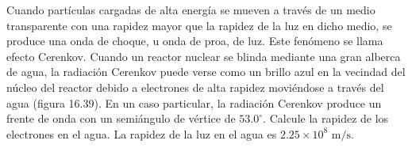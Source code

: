 \item Cuando partículas cargadas de alta energía se mueven a través de un medio transparente con una rapidez mayor que la rapidez de la luz en dicho medio, se produce una onda de choque, u onda de proa, de luz. Este fenómeno se llama efecto Cerenkov. Cuando un reactor nuclear se blinda mediante una gran alberca de agua, la radiación Cerenkov puede verse como un brillo azul en la vecindad del núcleo del reactor debido a electrones de alta rapidez moviéndose a través del agua (figura 16.39). En un caso particular, la radiación Cerenkov produce un frente de onda con un semiángulo de vértice de $53.0^\circ$. Calcule la rapidez de los electrones en el agua. La rapidez de la luz en el agua es $2.25 \times 10^8\text{ m/s}$.